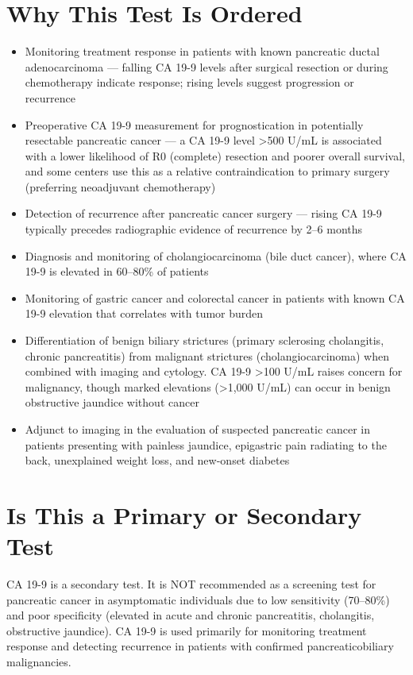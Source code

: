 \section*{Why This Test Is Ordered}
\begin{itemize}
  \item Monitoring treatment response in patients with known pancreatic ductal adenocarcinoma --- falling CA 19-9 levels after surgical resection or during chemotherapy indicate response; rising levels suggest progression or recurrence
  \item Preoperative CA 19-9 measurement for prognostication in potentially resectable pancreatic cancer --- a CA 19-9 level >500 U/mL is associated with a lower likelihood of R0 (complete) resection and poorer overall survival, and some centers use this as a relative contraindication to primary surgery (preferring neoadjuvant chemotherapy)
  \item Detection of recurrence after pancreatic cancer surgery --- rising CA 19-9 typically precedes radiographic evidence of recurrence by 2--6 months
  \item Diagnosis and monitoring of cholangiocarcinoma (bile duct cancer), where CA 19-9 is elevated in 60--80\% of patients
  \item Monitoring of gastric cancer and colorectal cancer in patients with known CA 19-9 elevation that correlates with tumor burden
  \item Differentiation of benign biliary strictures (primary sclerosing cholangitis, chronic pancreatitis) from malignant strictures (cholangiocarcinoma) when combined with imaging and cytology. CA 19-9 >100 U/mL raises concern for malignancy, though marked elevations (>1,000 U/mL) can occur in benign obstructive jaundice without cancer
  \item Adjunct to imaging in the evaluation of suspected pancreatic cancer in patients presenting with painless jaundice, epigastric pain radiating to the back, unexplained weight loss, and new-onset diabetes
\end{itemize}

\section*{Is This a Primary or Secondary Test}
CA 19-9 is a secondary test. It is NOT recommended as a screening test for pancreatic cancer in asymptomatic individuals due to low sensitivity (70--80\%) and poor specificity (elevated in acute and chronic pancreatitis, cholangitis, obstructive jaundice). CA 19-9 is used primarily for monitoring treatment response and detecting recurrence in patients with confirmed pancreaticobiliary malignancies.


